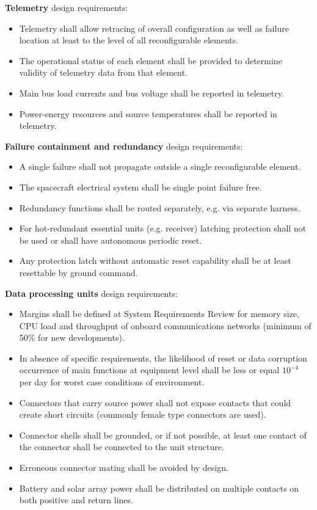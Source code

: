 \textbf{Telemetry} design requirements:

\begin{itemize}
\item Telemetry shall allow retracing of overall configuration as well as failure location at least to the level of all reconfigurable elements.
\item The operational status of each element shall be provided to determine validity of telemetry data from that element.
\item Main bus load currents and bus voltage shall be reported in telemetry.
\item Power-energy resources and source temperatures shall be reported in telemetry.
\end{itemize}

\textbf{Failure containment and redundancy} design requirements:

\begin{itemize}
\item A single failure shall not propagate outside a single reconfigurable element.
\item The spacecraft electrical system shall be single point failure free.
\item Redundancy functions shall be routed separately, e.g. via separate harness.
\item For hot-redundant essential units (e.g. receiver) latching protection shall not be used or shall have autonomous periodic reset.
\item Any protection latch without automatic reset capability shall be at least resettable by ground command.
\end{itemize}

\textbf{Data processing units} design requirements:

\begin{itemize}
\item Margins shall be defined at System Requirements Review for memory size, CPU load and throughput of onboard communications networks (minimum of 50\% for new developments).
\item In absence of specific requirements, the likelihood of reset or data corruption occurrence of main functions at equipment level shall be less or equal $10^{-4}$ per day for worst case conditions of environment.
\item Connectors that carry source power shall not expose contacts that could create short circuits (commonly female type connectors are used).
\item Connector shells shall be grounded, or if not possible, at least one contact of the connector shall be connected to the unit structure.
\item Erroneous connector mating shall be avoided by design.
\item Battery and solar array power shall be distributed on multiple contacts on both positive and return lines.
\end{itemize}

